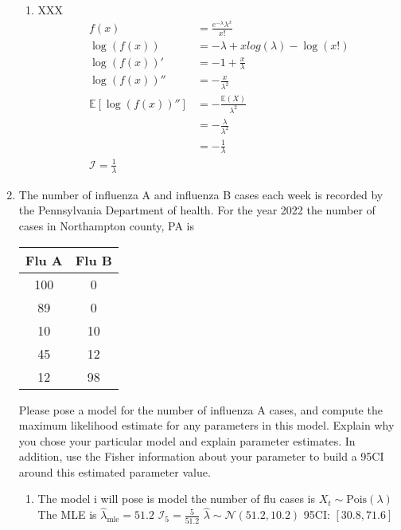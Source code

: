 \documentclass[krantz1,ChapterTOCs]{krantz}
\begin{document}
\begin{enumerate}
        \begin{enumerate}
            \item { \color{red} XXX 
            \begin{align}
                f(x) &= \frac{e^{-\lambda} \lambda ^{x} }{x!} \\ 
                \log \left( f(x) \right) &= -\lambda + x log(\lambda) - \log(x!) \\ 
                \log \left( f(x) \right)' &= -1 + \frac{x}{\lambda} \\ 
                \log \left( f(x) \right)'' &= -\frac{x}{\lambda^{2}} \\ 
                \mathbb{E}\left[ \log \left( f(x) \right)''\right] &= -\frac{\mathbb{E}(X)}{\lambda^{2}} \\ &= -\frac{\lambda}{\lambda^{2}} \\ 
                &= -\frac{1}{\lambda} \\ 
                \mathcal{I} = \frac{1}{\lambda}
            \end{align}
            }
        \end{enumerate}
        
        
    \item The number of influenza A and influenza B cases each week is recorded by the Pennsylvania Department of health. 
    For the year 2022 the number of cases in Northampton county, PA is 
    \begin{table}[ht!]
        \centering
        \begin{tabular}{cc}
           Flu A & Flu B  \\
           \hline
            100 & 0 \\ 
            89 & 0 \\ 
            10 & 10 \\ 
            45 & 12 \\ 
            12 & 98 \\ 
        \end{tabular}
    \end{table}
    Please pose a model for the number of influenza A cases, and compute the maximum likelihood estimate for any parameters in this model. 
    Explain why you chose your particular model and explain parameter estimates.
    In addition, use the Fisher information about your parameter to build a 95CI around this estimated parameter value.

        \begin{enumerate}
            \item { \color{red} 
            The model i will pose is model the number of flu cases is $X_{t} \sim \text{Pois}(\lambda)$
            The MLE is $\hat{\lambda}_{\text{mle}} = 51.2$
            $\mathcal{I}_{5} = \frac{5}{51.2}$
            $\hat{\lambda} \sim \mathcal{N}(51.2, 10.2)$
            95CI: $[30.8, 71.6]$
            }
        \end{enumerate}
    \end{enumerate}
    
    
    
    
    
    
    
    
    
    
\end{document}
